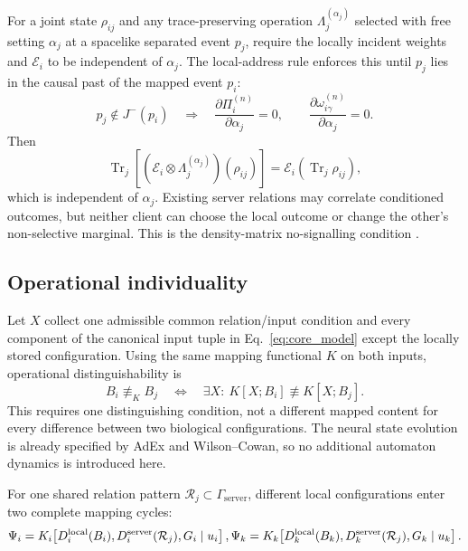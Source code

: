For a joint state $\rho_{ij}$ and any trace-preserving operation
$\Lambda_j^{(\alpha_j)}$ selected with free setting $\alpha_j$ at a spacelike separated event
$p_j$, require the locally incident weights and $\mathcal E_i$ to be independent of
$\alpha_j$. The local-address rule enforces this until $p_j$ lies in the causal past of
the mapped event $p_i$:
\begin{equation}
  p_j\notin J^-(p_i)
  \quad\Longrightarrow\quad
  \frac{\partial\Pi_i^{(n)}}{\partial \alpha_j}=0,
  \qquad
  \frac{\partial\omega_{i\gamma}^{(n)}}{\partial \alpha_j}=0.
  \label{eq:local_setting_independence}
\end{equation}
Then
\begin{equation}
  \operatorname{Tr}_j\!\left[
    (\mathcal E_i\otimes\Lambda_j^{(\alpha_j)})(\rho_{ij})
  \right]
  =\mathcal E_i\!\left(\operatorname{Tr}_j\rho_{ij}\right),
  \label{eq:weighted_filter_no_signalling}
\end{equation}
which is independent of $\alpha_j$. Existing server relations may correlate conditioned
outcomes, but neither client can choose the local outcome or change the other's
non-selective marginal. This is the density-matrix no-signalling condition
\citep{simon2001nosignaling}.

\subsection{Operational individuality}

Let $X$ collect one admissible common relation/input condition and every component of
the canonical input tuple in Eq.~\eqref{eq:core_model} except the locally stored
configuration. Using the same mapping functional $K$ on both inputs, operational
distinguishability is
\begin{equation}
  B_i\not\equiv_K B_j
  \quad\Longleftrightarrow\quad
  \exists X:\ K[X;B_i]\not\equiv K[X;B_j].
  \label{eq:individuality}
\end{equation}
This requires one distinguishing condition, not a different mapped content for
every difference between two biological configurations. The neural state evolution
is already specified by AdEx and Wilson--Cowan, so no additional automaton dynamics
is introduced here.

For one shared relation pattern $\mathcal R_j\subset\Gamma_{\mathrm{server}}$,
different local configurations enter two complete mapping cycles:
\begin{equation}
  \Psi_i=K_i\!\left[D_i^{\mathrm{local}}(B_i),
    D_i^{\mathrm{server}}(\mathcal R_j),G_i\mid u_i\right],
  \\
  \Psi_k=K_k\!\left[D_k^{\mathrm{local}}(B_k),
    D_k^{\mathrm{server}}(\mathcal R_j),G_k\mid u_k\right].
  \label{eq:shared_relation_local_mappings}
\end{equation}

